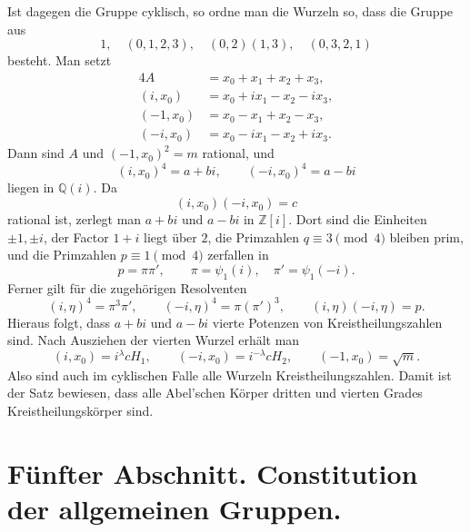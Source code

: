 \documentclass[11pt]{article}
\begin{document}
Ist dagegen die Gruppe cyklisch, so ordne man die Wurzeln so, dass die Gruppe aus
\begin{equation}
 1,
 \quad (0,1,2,3),
 \quad (0,2)(1,3),
 \quad (0,3,2,1)
 \tag{4}
\end{equation}
besteht. Man setzt
\begin{equation}
\begin{aligned}
 4A&=x_0+x_1+x_2+x_3,\\
 (i,x_0)&=x_0+i x_1-x_2-i x_3,\\
 (-1,x_0)&=x_0-x_1+x_2-x_3,\\
 (-i,x_0)&=x_0-i x_1-x_2+i x_3.
\end{aligned}
\tag{5}
\end{equation}
Dann sind $A$ und $(-1,x_0)^2=m$ rational, und
\begin{equation}
   (i,x_0)^4=a+bi,
   \qquad
   (-i,x_0)^4=a-bi
   \tag{6}
\end{equation}
liegen in $\mathbb Q(i)$. Da
\begin{equation}
   (i,x_0)(-i,x_0)=c
   \tag{7}
\end{equation}
rational ist, zerlegt man $a+bi$ und $a-bi$ in $\mathbb Z[i]$. Dort sind die Einheiten $\pm1,\pm i$, der Factor $1+i$ liegt über $2$, die Primzahlen $q\equiv3\pmod4$ bleiben prim, und die Primzahlen $p\equiv1\pmod4$ zerfallen in
\begin{equation}
  p=\pi\pi',
  \qquad
  \pi=\psi_1(i),
  \quad
  \pi'=\psi_1(-i).
  \tag{8}
\end{equation}
Ferner gilt für die zugehörigen Resolventen
\begin{equation}
   (i,\eta)^4=\pi^3\pi',
   \qquad
   (-i,\eta)^4=\pi(\pi')^3,
   \qquad
   (i,\eta)(-i,\eta)=p.
   \tag{9}
\end{equation}
Hieraus folgt, dass $a+bi$ und $a-bi$ vierte Potenzen von Kreistheilungszahlen sind. Nach Ausziehen der vierten Wurzel erhält man
\begin{equation}
   (i,x_0)=i^\lambda cH_1,
   \qquad
   (-i,x_0)=i^{-\lambda}cH_2,
   \qquad
   (-1,x_0)=\sqrt m.
   \tag{10}
\end{equation}
Also sind auch im cyklischen Falle alle Wurzeln Kreistheilungszahlen. Damit ist der Satz bewiesen, dass alle Abel'schen Körper dritten und vierten Grades Kreistheilungskörper sind.


\clearpage

\section*{Fünfter Abschnitt. Constitution der allgemeinen Gruppen.}
\end{document}
